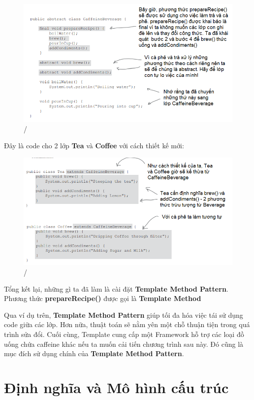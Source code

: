 \begin{figure}[!htb]
    \centering
    \includegraphics[width=\textwidth]{fig/Template/CaffeineBeverage.png}/
\end{figure}

Đây là code cho 2 lớp \textbf{Tea} và \textbf{Coffee} với cách thiết kế mới:
\begin{figure}[!htb]
    \centering
    \includegraphics[width=\textwidth]{fig/Template/TeaAndCoffeeNewDesign.png}/
\end{figure}

Tổng kết lại, những gì ta đã làm là cài đặt \textbf{Template Method Pattern}. Phương thức \textbf{prepareRecipe()} được gọi là \textbf{Template Method}\smallskip

Qua ví dụ trên, \textbf{Template Method Pattern} giúp tối đa hóa việc tái sử dụng code giữa các lớp. Hơn nữa, thuật toán sẽ nằm yên một chỗ thuận tiện trong quá trình sửa đổi. Cuối cùng, Template cung cấp một Framework hỗ trợ các loại đồ uống chứa caffeine khác nếu ta muốn cải tiến chương trình sau này. Đó cũng là mục đích sử dụng chính của \textbf{Template Method Pattern}.

\newpage
\section{Định nghĩa và Mô hình cấu trúc}
